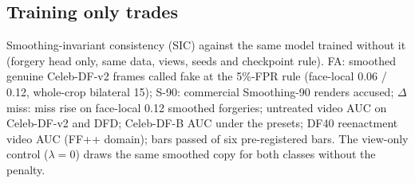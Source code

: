 \documentclass[conference]{IEEEtran}
\begin{document}
\subsection{Training only trades}
\label{sec:sic}
\begin{table}[t]
\centering
\caption{Smoothing-invariant consistency (SIC) against the same model trained without it (forgery head only, same data,
views, seeds and checkpoint rule). FA: smoothed genuine Celeb-DF-v2 frames called fake at the 5\%-FPR rule (face-local 0.06 /
0.12, whole-crop bilateral 15); S-90: commercial Smoothing-90 renders accused; $\Delta$miss: miss rise on face-local 0.12
smoothed forgeries; untreated video AUC on Celeb-DF-v2 and DFD; Celeb-DF-B AUC under the presets; DF40 reenactment video AUC
(FF++ domain); bars passed of six pre-registered bars. The view-only control ($\lambda=0$) draws the same smoothed copy for
both classes without the penalty.}
\label{tab:sic}
\footnotesize
\begin{adjustbox}{max width=\textwidth}\end{adjustbox}
\end{table}
\end{document}
